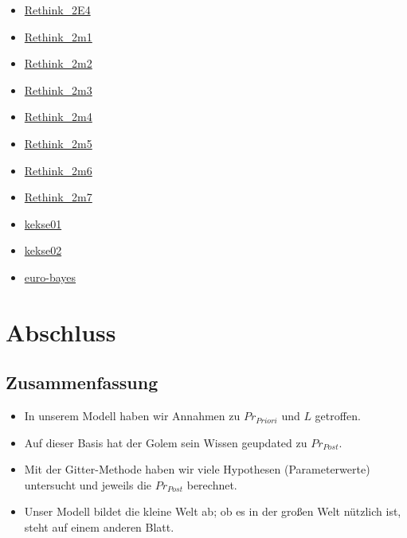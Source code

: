 \documentclass[
  a4paper,
  DIV=11]{scrreprt}
\providecommand{\tightlist}{%
  \setlength{\itemsep}{0pt}\setlength{\parskip}{0pt}}\usepackage{longtable,booktabs,array}
\theoremstyle{definition}
\theoremstyle{remark}
\begin{document}
\begin{itemize}
\tightlist
\item
  \href{https://datenwerk.netlify.app/posts/rethink_2e4/rethink_2e4}{Rethink\_2E4}
\item
  \href{https://datenwerk.netlify.app/posts/rethink_2m1/rethink_2m1}{Rethink\_2m1}
\item
  \href{https://datenwerk.netlify.app/posts/rethink_2m2/rethink_2m2}{Rethink\_2m2}
\item
  \href{https://datenwerk.netlify.app/posts/rethink_2m3/rethink_2m3}{Rethink\_2m3}
\item
  \href{https://datenwerk.netlify.app/posts/rethink_2m4/rethink_2m4}{Rethink\_2m4}
\item
  \href{https://datenwerk.netlify.app/posts/rethink_2m5/rethink_2m5}{Rethink\_2m5}
\item
  \href{https://datenwerk.netlify.app/posts/rethink_2m6/rethink_2m6}{Rethink\_2m6}
\item
  \href{https://datenwerk.netlify.app/posts/rethink_2m7/rethink_2m7}{Rethink\_2m7}
\item
  \href{https://datenwerk.netlify.app/posts/kekse01/kekse01.html}{kekse01}
\item
  \href{https://datenwerk.netlify.app/posts/kekse01/kekse02.html}{kekse02}
\item
  \href{https://datenwerk.netlify.app/posts/euro-bayes/euro-bayes.html}{euro-bayes}
\end{itemize}

\hypertarget{abschluss}{%
\section{Abschluss}\label{abschluss}}

\hypertarget{zusammenfassung}{%
\subsection{Zusammenfassung}\label{zusammenfassung}}

\begin{itemize}
\item
  In unserem Modell haben wir Annahmen zu \(Pr_{Priori}\) und \(L\)
  getroffen.
\item
  Auf dieser Basis hat der Golem sein Wissen geupdated zu \(Pr_{Post}\).
\item
  Mit der Gitter-Methode haben wir viele Hypothesen (Parameterwerte)
  untersucht und jeweils die \(Pr_{Post}\) berechnet.
\item
  Unser Modell bildet die kleine Welt ab; ob es in der großen Welt
  nützlich ist, steht auf einem anderen Blatt.
\end{itemize}
\end{document}
